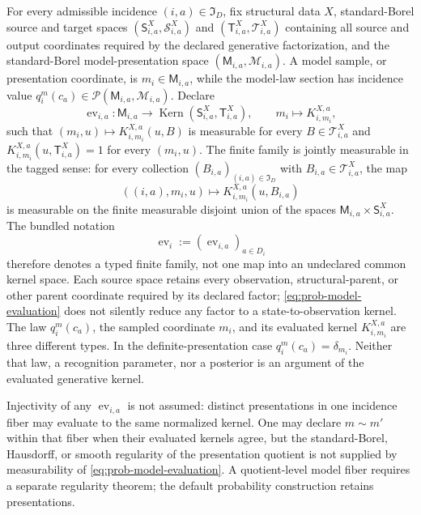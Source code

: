 \medskip
{}
For every admissible incidence \((i,a)\in\mathfrak I_D\), fix structural data \(X\),
standard-Borel source and target spaces
\((\mathsf S_{i,a}^X,\mathscr S_{i,a}^X)\) and
\((\mathsf T_{i,a}^X,\mathscr T_{i,a}^X)\) containing all source and output
coordinates required by the declared generative factorization, and the standard-Borel
model-presentation space \((\mathsf M_{i,a},\mathscr M_{i,a})\). A model sample,
or presentation coordinate, is \(m_i\in\mathsf M_{i,a}\), while the model-law
section has incidence value
\(q_i^m(c_a)\in\mathcal P(\mathsf M_{i,a},\mathscr M_{i,a})\). Declare
\begin{equation}
\operatorname{ev}_{i,a}:\mathsf M_{i,a}\longrightarrow
\operatorname{Kern}(\mathsf S_{i,a}^X,\mathsf T_{i,a}^X),
\qquad
m_i\longmapsto K^{X,a}_{i,m_i},
\label{eq:prob-model-evaluation}
\end{equation}
such that \((m_i,u)\mapsto K^{X,a}_{i,m_i}(u,B)\) is measurable for every
\(B\in\mathscr T_{i,a}^X\) and
\(K^{X,a}_{i,m_i}(u,\mathsf T_{i,a}^X)=1\) for every \((m_i,u)\).
The finite family is jointly measurable in the tagged sense: for every collection
\((B_{i,a})_{(i,a)\in\mathfrak I_D}\) with
\(B_{i,a}\in\mathscr T_{i,a}^X\), the map
\[
((i,a),m_i,u)\longmapsto K^{X,a}_{i,m_i}(u,B_{i,a})
\]
is measurable on the finite measurable disjoint union of the spaces
\(\mathsf M_{i,a}\times\mathsf S_{i,a}^X\). The bundled notation
\[
\operatorname{ev}_i:=(\operatorname{ev}_{i,a})_{a\in D_i}
\]
therefore denotes a typed finite family, not one map into an undeclared common
kernel space. Each source space retains every observation, structural-parent,
or other parent coordinate required by its declared factor;
\eqref{eq:prob-model-evaluation} does not silently reduce any factor to a
state-to-observation kernel. The law \(q_i^m(c_a)\), the sampled coordinate
\(m_i\), and its evaluated kernel \(K^{X,a}_{i,m_i}\) are three different
types. In the definite-presentation case
\(q_i^m(c_a)=\delta_{m_i}\). Neither that law, a recognition parameter, nor a
posterior is an argument of the evaluated generative kernel. 
\medskip

Injectivity of any \(\operatorname{ev}_{i,a}\) is not assumed: distinct
presentations in one incidence fiber may evaluate to the same normalized
kernel. One may declare \(m\sim m'\) within that fiber when their evaluated
kernels agree, but the standard-Borel, Hausdorff, or smooth regularity of the
presentation quotient is not supplied by measurability of
\eqref{eq:prob-model-evaluation}. A quotient-level model fiber requires a
separate regularity theorem; the default probability construction retains
presentations. 

